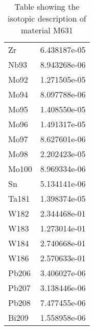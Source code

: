 \begin{centering}
\begin{table}[ht!]
\begin{tabular}{l | c}
Zr & 6.438187e-05\\
Nb93 & 8.943268e-06\\
Mo92 & 1.271505e-05\\
Mo94 & 8.097788e-06\\
Mo95 & 1.408550e-05\\
Mo96 & 1.491317e-05\\
Mo97 & 8.627601e-06\\
Mo98 & 2.202423e-05\\
Mo100 & 8.969334e-06\\
Sn & 5.134141e-06\\
Ta181 & 1.398374e-05\\
W182 & 2.344468e-01\\
W183 & 1.273014e-01\\
W184 & 2.740668e-01\\
W186 & 2.570633e-01\\
Pb206 & 3.406027e-06\\
Pb207 & 3.138446e-06\\
Pb208 & 7.477455e-06\\
Bi209 & 1.558958e-06
\end{tabular}
\caption{Table showing the isotopic description of material M631}
\label{table:material_M631}
\end{table}\clearpage


\end{centering}
